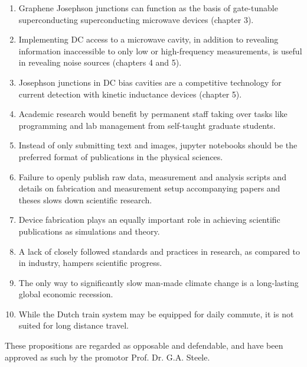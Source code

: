 \documentclass{dissertation-edit}
\begin{document}
\begin{enumerate}

\item Graphene Josephson junctions can function as the basis of gate-tunable superconducting superconducting microwave devices (chapter 3).
%
\item Implementing DC access to a microwave cavity, in addition to revealing information inaccessible to only low or high-frequency measurements, is useful in revealing noise sources (chapters 4 and 5).
%
\item Josephson junctions in DC bias cavities are a competitive technology for current detection with kinetic inductance devices (chapter 5).
%
\item Academic research would benefit by permanent staff taking over tasks like programming and lab management from self-taught graduate students.
%
\item Instead of only submitting text and images, jupyter notebooks should be the preferred format of publications in the physical sciences.
%
\item Failure to openly publish raw data, measurement and analysis scripts and details on fabrication and measurement setup accompanying papers and theses slows down scientific research.
%
\item Device fabrication plays an equally important role in achieving scientific publications as simulations and theory.
%
\item A lack of closely followed standards and practices in research, as compared to in industry, hampers scientific progress.
%
\item The only way to significantly slow man-made climate change is a long-lasting global economic recession.
%
\item While the Dutch train system may be equipped for daily commute, it is not suited for long distance travel.

\end{enumerate}

\bigskip
\bigskip

\begin{center}
These propositions are regarded as opposable and defendable, and have been approved as such by the promotor Prof. Dr. G.A. Steele.
\end{center}
\end{document}
